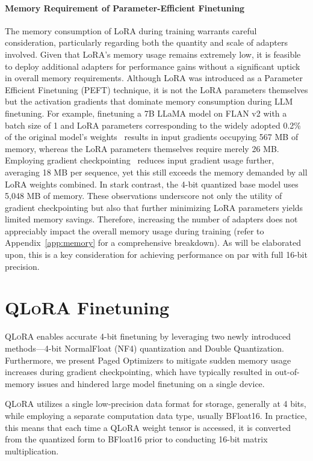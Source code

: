 \paragraph{Memory Requirement of Parameter-Efficient Finetuning} The memory consumption of LoRA during training warrants careful consideration, particularly regarding both the quantity and scale of adapters involved. Given that LoRA’s memory usage remains extremely low, it is feasible to deploy additional adapters for performance gains without a significant uptick in overall memory requirements. Although LoRA was introduced as a Parameter Efficient Finetuning (PEFT) technique, it is not the LoRA parameters themselves but the activation gradients that dominate memory consumption during LLM finetuning. For example, finetuning a 7B LLaMA model on FLAN v2 with a batch size of 1 and LoRA parameters corresponding to the widely adopted 0.2\% of the original model’s weights~\citep{hu2021lora,liu2022few} results in input gradients occupying 567 MB of memory, whereas the LoRA parameters themselves require merely 26 MB. Employing gradient checkpointing~\citep{chen2016training} reduces input gradient usage further, averaging 18 MB per sequence, yet this still exceeds the memory demanded by all LoRA weights combined. In stark contrast, the 4-bit quantized base model uses 5,048 MB of memory. These observations underscore not only the utility of gradient checkpointing but also that further minimizing LoRA parameters yields limited memory savings. Therefore, increasing the number of adapters does not appreciably impact the overall memory usage during training (refer to Appendix~\ref{app:memory} for a comprehensive breakdown). As will be elaborated upon, this is a key consideration for achieving performance on par with full 16-bit precision.

\section{\textsc{QLoRA} Finetuning}

\textsc{QLoRA} enables accurate 4-bit finetuning by leveraging two newly introduced methods—4-bit NormalFloat (NF4) quantization and Double Quantization. Furthermore, we present Paged Optimizers to mitigate sudden memory usage increases during gradient checkpointing, which have typically resulted in out-of-memory issues and hindered large model finetuning on a single device.

\textsc{QLoRA} utilizes a single low-precision data format for storage, generally at 4 bits, while employing a separate computation data type, usually BFloat16. In practice, this means that each time a \textsc{QLoRA} weight tensor is accessed, it is converted from the quantized form to BFloat16 prior to conducting 16-bit matrix multiplication.

